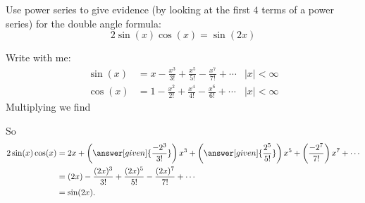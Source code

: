 \documentclass{ximera}
\begin{document}
\begin{example}
  Use power series to give evidence (by looking at the first $4$ terms
  of a power series) for the double angle formula:
  \[
  2\sin(x) \cos(x) = \sin(2x)
  \]
  \begin{explanation}
    Write with me:
    \begin{align*}
      \sin(x) &= x - \frac{x^3}{3!} + \frac{x^5}{5!} -\frac{x^7}{7!} + \cdots &|x|< \infty\\
      \cos(x) &= 1-\frac{x^2}{2!} + \frac{x^4}{4!} -\frac{x^6}{6!} + \cdots &|x|< \infty
    \end{align*}
    Multiplying we find
    \begin{image}
    \end{image}
    So
    \begin{align*}
      2\sin(x)\cos(x) &= 2x + \left(\answer[given]{\frac{-2^3}{3!}}\right)x^3 + \left(\answer[given]{\frac{2^5}{5!}}\right)x^5+\left(\frac{-2^7}{7!}\right)x^7 +\cdots\\
      &= (2x) -\frac{(2x)^3}{3!} + \frac{(2x)^5}{5!}-\frac{(2x)^7}{7!} +\cdots\\
      &= \sin(2x).
    \end{align*}
  \end{explanation}
\end{example}
\end{document}
